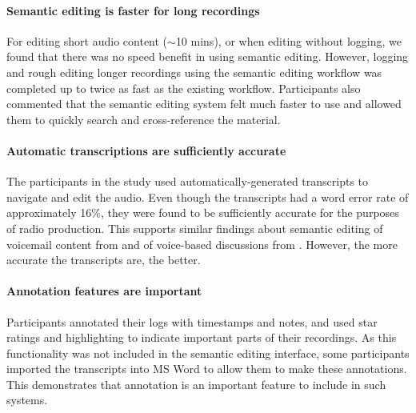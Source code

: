 \paragraph{Semantic editing is faster for long recordings}
For editing short audio content ($\sim$10 mins), or when editing without logging, we found that there was no speed
benefit in using semantic editing. However, logging and rough editing longer recordings using the semantic editing
workflow was completed up to twice as fast as the existing workflow. Participants also commented that the semantic
editing system felt much faster to use and allowed them to quickly search and cross-reference the material.

\paragraph{Automatic transcriptions are sufficiently accurate}
The participants in the study used automatically-generated transcripts to navigate and edit the audio. Even though the
transcripts had a word error rate of approximately 16\%, they were found to be sufficiently accurate for the purposes
of radio production.  This supports similar findings about semantic editing of voicemail content from
\citet{Whittaker2004} and of voice-based discussions from \citet{Sivaraman2016}. However, the more accurate the
transcripts are, the better.

\paragraph{Annotation features are important}
Participants annotated their logs with timestamps and notes, and used star ratings and highlighting to indicate
important parts of their recordings. As this functionality was not included in the semantic editing interface, some
participants imported the transcripts into MS Word to allow them to make these annotations.  This demonstrates that
annotation is an important feature to include in such systems.


